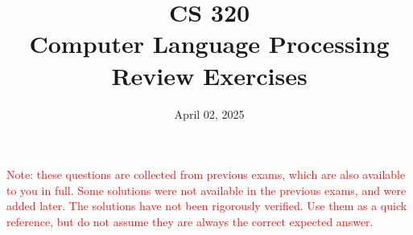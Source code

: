 \documentclass[a4paper]{article}
\title{CS 320 \\ Computer Language Processing\\Review Exercises}
\author{}
\date{April 02, 2025}
\begin{document}
\maketitle

\textcolor{red}{Note: these questions are collected from previous exams, which
are also available to you in full. Some solutions were not available in the
previous exams, and were added later. The solutions have not been rigorously
verified. Use them as a quick reference, but do not assume they are always the
correct expected answer.}





\end{document}
